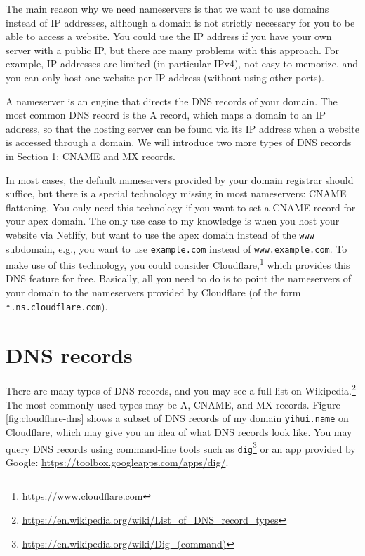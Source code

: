 \documentclass[12pt,]{krantz}
\renewcommand{\href}[2]{#2\footnote{\url{#1}}}
\theoremstyle{definition}
\theoremstyle{definition}
\theoremstyle{definition}
\theoremstyle{remark}
\begin{document}
The main reason why we need nameservers is that we
want to use domains instead of IP addresses, although a domain is not
strictly necessary for you to be able to access a website. You could use
the IP address if you have your own server with a public IP, but there
are many problems with this approach. For example, IP addresses are
limited (in particular IPv4), not easy to memorize, and you can only
host one website per IP address (without using other ports).

A nameserver is an engine that directs the DNS records of your domain.
The most common DNS record is the A record, which maps a domain to an IP
address, so that the hosting server can be found via its IP address when
a website is accessed through a domain. We will introduce two more types
of DNS records in Section \ref{dns-records}: CNAME and MX records.

In most cases, the default nameservers provided by your domain registrar
should suffice, but there is a special technology missing in most
nameservers: CNAME flattening. You only need this technology if you want
to set a CNAME record for your apex domain. The only use case to my
knowledge is when you host your website via Netlify, but want to use the
apex domain instead of the \texttt{www} subdomain, e.g., you want to use
\texttt{example.com} instead of \texttt{www.example.com}. To make use of
this technology, you could consider
\href{https://www.cloudflare.com}{Cloudflare,} which provides this DNS
feature for free. Basically, all you need to do is to point the
nameservers of your domain to the nameservers provided by Cloudflare (of
the form \texttt{*.ns.cloudflare.com}).

\section{DNS records}\label{dns-records}

There are many types of DNS records, and you may see
a full list on
\href{https://en.wikipedia.org/wiki/List_of_DNS_record_types}{Wikipedia.}
The most commonly used types may be A, CNAME, and MX records. Figure
\ref{fig:cloudflare-dns} shows a subset of DNS records of my domain
\texttt{yihui.name} on Cloudflare, which may give you an idea of what
DNS records look like. You may query DNS records using command-line
tools such as
\href{https://en.wikipedia.org/wiki/Dig_(command)}{\texttt{dig}} or an
app provided by Google: \url{https://toolbox.googleapps.com/apps/dig/}.
\end{document}
